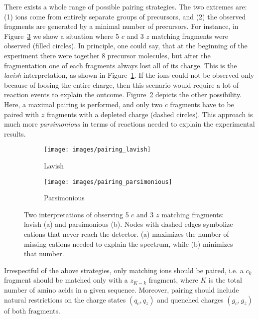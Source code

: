 \documentclass[journal=ancham, manuscript=article, layout=twocolumn]{achemso}
\begin{document}
There exists a whole range of possible pairing strategies. 
The two extremes are: (1) ions come from entirely separate groups of precursors, and (2) the observed fragments are generated by a minimal number of precursors. 
For instance, in Figure~\ref{fig::pairing problem} we show a situation where 5 $c$ and 3 $z$ matching fragments were observed (filled circles).
In principle, one could say, that at the beginning of the experiment there were together 8 precursor molecules, but after the fragmentation one of each fragments always lost all of its charge.
This is the \textit{lavish} interpretation, as shown in Figure~\ref{fig::lavish pairing}.
If the ions could not be observed only because of loosing the entire charge, then this scenario would require a lot of reaction events to explain the outcome.
Figure~\ref{fig::parsimonious pairing} depicts the other possibility. 
Here, a maximal pairing is performed, and only two $c$ fragments have to be paired with $z$ fragments with a depleted charge (dashed circles). 
This approach is much more \textit{parsimonious} in terms of reactions needed to explain the experimental results.
\begin{figure}[t]
    \begin{subfigure}[b]{0.55\linewidth}
        \texttt{[image: images/pairing\_lavish]}
        \caption{Lavish}
        \label{fig::lavish pairing}
    \end{subfigure}
    \begin{subfigure}[b]{0.4\linewidth}
    	\centering
        \texttt{[image: images/pairing\_parsimonious]}
        \caption{Parsimonious}
        \label{fig::parsimonious pairing}
    \end{subfigure}
    \caption{Two interpretations of observing 5 $c$ and 3 $z$ matching fragments: lavish (a) and parsimonious (b). Nodes with dashed edges symbolize cations that never reach the detector. (a) maximizes the number of missing cations needed to explain the spectrum, while (b) minimizes that number.
    }\label{fig::pairing problem}
\end{figure}

Irrespectful of the above strategies, only matching ions should be paired, i.e. a $c_k$ fragment should be matched only with a $z_{K-k}$ fragment, where $K$ is the total number of amino acids in a given sequence. 
Moreover, pairing should include natural restrictions on the charge states $(q_c,q_z)$ and quenched charges $(g_c,g_z)$ of both fragments. 
\end{document}

